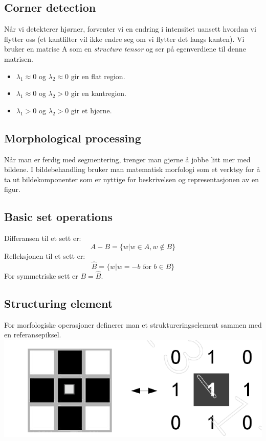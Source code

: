 \subsection{Corner detection}
Når vi detekterer hjørner, forventer vi en endring i intensitet uansett hvordan vi flytter oss (et kantfilter vil ikke endre seg om vi flytter det langs kanten). Vi bruker en matrise A som en \emph{structure tensor} og ser på egenverdiene til denne matrisen.

\begin{itemize}
    \item $\lambda_1 \approx 0$ og $\lambda_2 \approx 0$ gir en flat region.
    \item $\lambda_1 \approx 0$ og $\lambda_2 > 0$ gir en kantregion.
    \item $\lambda_1 > 0$ og $\lambda_2 > 0$ gir et hjørne.
\end{itemize}

\subsection{Morphological processing}
Når man er ferdig med segmentering, trenger man gjerne å jobbe litt mer med bildene. I bildebehandling bruker man matematisk morfologi som et verktøy for å ta ut bildekomponenter som er nyttige for beskrivelsen og representasjonen av en figur.

\subsection{Basic set operations}
Differansen til et sett er:
\begin{equation}
    A - B = \{w|w \in A, w \notin B \}
\end{equation}
Refleksjonen til et sett er:
\begin{equation}
    \hat B = \{w|\text{$w=-b$ for $b \in B$}\}
\end{equation}
For symmetriske sett er $B=\hat B$.

\subsection{Structuring element}
For morfologiske operasjoner definerer man et struktureringselement sammen med en referansepiksel.
\\ \includegraphics[width=\textwidth]{Bilder/se.png}

